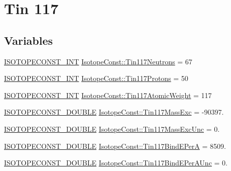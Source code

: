 \hypertarget{group___isotope_const-_tin-_sn117}{}\section{Tin 117}
\label{group___isotope_const-_tin-_sn117}
\subsection*{Variables}
\begin{DoxyCompactItemize}
\item 
\mbox{\hyperlink{group___isotope_const-_macros_ga5f18360b3e99483a35c32d789e62621c}{I\+S\+O\+T\+O\+P\+E\+C\+O\+N\+S\+T\+\_\+\+I\+NT}} \mbox{\hyperlink{group___isotope_const-_tin-_sn117_ga96d4831cfe6ace843e460f03c91c4f37}{Isotope\+Const\+::\+Tin117\+Neutrons}} = 67
\item 
\mbox{\hyperlink{group___isotope_const-_macros_ga5f18360b3e99483a35c32d789e62621c}{I\+S\+O\+T\+O\+P\+E\+C\+O\+N\+S\+T\+\_\+\+I\+NT}} \mbox{\hyperlink{group___isotope_const-_tin-_sn117_ga60e1af901ebc8217782279586a952d74}{Isotope\+Const\+::\+Tin117\+Protons}} = 50
\item 
\mbox{\hyperlink{group___isotope_const-_macros_ga5f18360b3e99483a35c32d789e62621c}{I\+S\+O\+T\+O\+P\+E\+C\+O\+N\+S\+T\+\_\+\+I\+NT}} \mbox{\hyperlink{group___isotope_const-_tin-_sn117_ga061b2b0036867e468580428f4c07f888}{Isotope\+Const\+::\+Tin117\+Atomic\+Weight}} = 117
\item 
\mbox{\hyperlink{group___isotope_const-_macros_ga8f45a7272ce02c0b4c65c44636ed719a}{I\+S\+O\+T\+O\+P\+E\+C\+O\+N\+S\+T\+\_\+\+D\+O\+U\+B\+LE}} \mbox{\hyperlink{group___isotope_const-_tin-_sn117_gaa14f4a5e67ac1a762da15d37d712e333}{Isotope\+Const\+::\+Tin117\+Mass\+Exc}} = -\/90397.
\item 
\mbox{\hyperlink{group___isotope_const-_macros_ga8f45a7272ce02c0b4c65c44636ed719a}{I\+S\+O\+T\+O\+P\+E\+C\+O\+N\+S\+T\+\_\+\+D\+O\+U\+B\+LE}} \mbox{\hyperlink{group___isotope_const-_tin-_sn117_ga433a6bbe948468bb96fb8962a3201fad}{Isotope\+Const\+::\+Tin117\+Mass\+Exc\+Unc}} = 0.
\item 
\mbox{\hyperlink{group___isotope_const-_macros_ga8f45a7272ce02c0b4c65c44636ed719a}{I\+S\+O\+T\+O\+P\+E\+C\+O\+N\+S\+T\+\_\+\+D\+O\+U\+B\+LE}} \mbox{\hyperlink{group___isotope_const-_tin-_sn117_ga421a7b66006d0292301fc8fefbb2b305}{Isotope\+Const\+::\+Tin117\+Bind\+E\+PerA}} = 8509.
\item 
\mbox{\hyperlink{group___isotope_const-_macros_ga8f45a7272ce02c0b4c65c44636ed719a}{I\+S\+O\+T\+O\+P\+E\+C\+O\+N\+S\+T\+\_\+\+D\+O\+U\+B\+LE}} \mbox{\hyperlink{group___isotope_const-_tin-_sn117_ga176e216ad5da2ae9d4d3178bc4acd9a3}{Isotope\+Const\+::\+Tin117\+Bind\+E\+Per\+A\+Unc}} = 0.

\end{DoxyCompactItemize}
